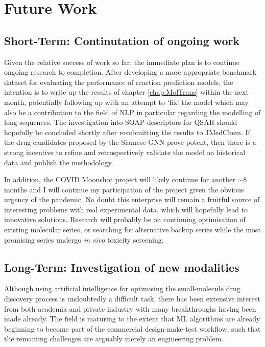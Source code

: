 \chapter{Future Work}


\section{Short-Term: Continutation of ongoing work}
Given the relative success of work so far, the immediate plan is to continue ongoing research to completion. After developing a more appropriate benchmark dataset for evaluating the performance of reaction prediction models, the intention is to write up the results of chapter \ref{chap:MolTrans} within the next month, potentially following up with an attempt to `fix' the model which may also be a contribution to the field of NLP in particular regarding the modelling of long sequences. The investigation into SOAP descriptors for QSAR should hopefully be concluded shortly after resubmitting the results to JMedChem. If the drug candidates proposed by the Siamese GNN prove potent, then there is a strong incentive to refine and retrospectively validate the model on historical data and publish the methodology.

In addition, the COVID Moonshot project will likely continue for another $\sim$8 months and I will continue my participation of the project given the obvious urgency of the pandemic. No doubt this enterprise will remain a fruitful source of interesting problems with real experimental data, which will hopefully lead to innovative solutions. Research will probably be on continuing optimisation of existing molecular series, or searching for alternative backup series while the most promising series undergo \textit{in vivo} toxicity screening.

\section{Long-Term: Investigation of new modalities}
Although using artificial intelligence for optimising the small-molecule drug discovery process is undoubtedly a difficult task, there has been extensive interest from both academia and private industry with many breakthroughs having been made already. The field is maturing to the extent that ML algorithms are already beginning to become part of the commercial design-make-test workflow, such that the remaining challenges are arguably merely an engineering problem. 

